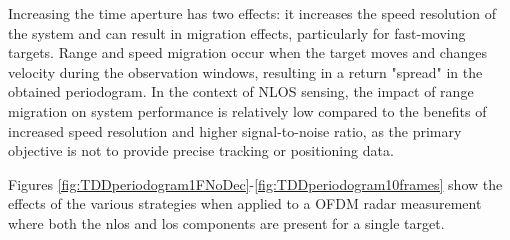 		     Increasing the time aperture has two effects: it increases the speed resolution of the system and can result in migration effects, particularly for fast-moving targets. 
		     Range and speed migration occur when the target moves and changes velocity during the observation windows, resulting in a return "spread" in the obtained periodogram.
		     In the context of NLOS sensing, the impact of range migration on system performance is relatively low compared to the benefits of increased speed resolution and higher signal-to-noise ratio, as the primary objective is not to provide precise tracking or positioning data.
			
			Figures \ref{fig:TDDperiodogram1FNoDec}-\ref{fig:TDDperiodogram10frames} show the effects of the various strategies when applied to a OFDM radar measurement where both the \gls{nlos} and \gls{los} components are present for a single target.
			
